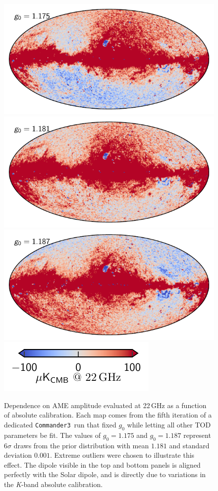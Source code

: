 \documentclass[twocolumn]{../../common/aa}
\def\commanderthree{\texttt{Commander3}}
\newcommand{\K}[0]{\textit K}
\begin{document}
\begin{figure}
	\centering
	\includegraphics[width=\columnwidth]{figures/ame_g01_175.pdf}
	\includegraphics[width=\columnwidth]{figures/ame_g01_181.pdf}
	\includegraphics[width=\columnwidth]{figures/ame_g01_187.pdf}
	\includegraphics[width=0.5\columnwidth]{figures/cbar_100uK.pdf}
	\caption{Dependence on AME amplitude evaluated at 22\,GHz as a function of absolute calibration. Each map comes from the fifth iteration of a dedicated \commanderthree\ run that fixed $g_0$ while letting all other TOD parameters be fit. The values of $g_0=1.175$ and $g_0=1.187$ represent $6\sigma$ draws from the prior distribution with mean $1.181$ and standard deviation $0.001$. Extreme outliers were chosen to illustrate this effect. The dipole visible in the top and bottom panels is aligned perfectly with the Solar dipole, and is directly due to variations in the \K-band absolute calibration.}
	\label{fig:g0_ame}
\end{figure}
\end{document}
